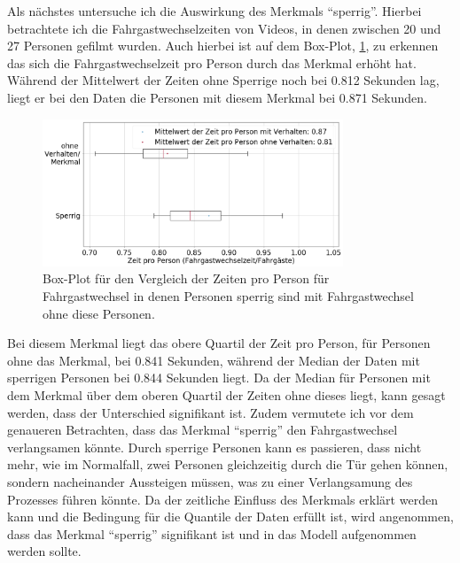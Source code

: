 Als nächstes untersuche ich die Auswirkung des Merkmals "`sperrig"'. Hierbei betrachtete ich die Fahrgastwechselzeiten von Videos, in denen zwischen 20 und 27 Personen gefilmt wurden. Auch hierbei ist auf dem Box-Plot, \figurename \ref{fig:BoxPlotSperrig}, zu erkennen das sich die Fahrgastwechselzeit pro Person durch das Merkmal erhöht hat. Während der Mittelwert der Zeiten ohne Sperrige noch bei 0.812 Sekunden lag, liegt er bei den Daten die Personen mit diesem Merkmal bei 0.871 Sekunden.
\begin{figure}[H]
	\centering
		\includegraphics[width=0.8\textwidth]{pictures/data_evaluation/behavior/comp_Sperrig.png}
	\caption{Box-Plot für den Vergleich der Zeiten pro Person für Fahrgastwechsel in denen Personen sperrig sind mit Fahrgastwechsel ohne diese Personen.}
	\label{fig:BoxPlotSperrig}
\end{figure}
Bei diesem Merkmal liegt das obere Quartil der Zeit pro Person, für Personen ohne das Merkmal, bei 0.841 Sekunden, während der Median der Daten mit sperrigen Personen bei 0.844 Sekunden liegt. Da der Median für Personen mit dem Merkmal über dem oberen Quartil der Zeiten ohne dieses liegt, kann gesagt werden, dass der Unterschied signifikant ist. Zudem vermutete ich vor dem genaueren Betrachten, dass das Merkmal "`sperrig"' den Fahrgastwechsel verlangsamen könnte. Durch sperrige Personen kann es passieren, dass nicht mehr, wie im Normalfall, zwei Personen gleichzeitig durch die Tür gehen können, sondern nacheinander Aussteigen müssen, was zu einer Verlangsamung des Prozesses führen könnte. Da der zeitliche Einfluss des Merkmals erklärt werden kann und die Bedingung für die Quantile der Daten erfüllt ist, wird angenommen, dass das Merkmal "`sperrig"' signifikant ist und in das Modell aufgenommen werden sollte.

